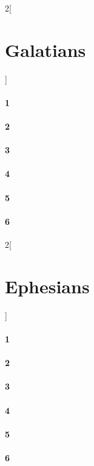 \documentclass{book}
\begin{document}
\begin{multicols}{2}[\part{Galatians}]
\subsection*{1}
\subsection*{2}
\subsection*{3}
\subsection*{4}
\subsection*{5}
\subsection*{6}
\end{multicols}
\begin{multicols}{2}[\part{Ephesians}]
\subsection*{1}
\subsection*{2}
\subsection*{3}
\subsection*{4}
\subsection*{5}
\subsection*{6}
\end{multicols}
\end{document}
